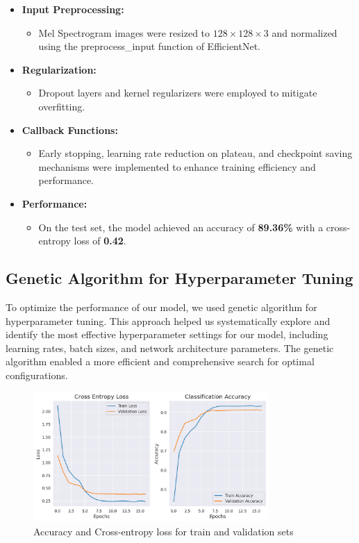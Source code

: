 \begin{itemize}
    \item \textbf{Input Preprocessing:}  
    \begin{itemize}
        \item Mel Spectrogram images were resized to \(128 \times 128 \times 3\) and normalized using the preprocess\_input function of EfficientNet.  
    \end{itemize}

    \item \textbf{Regularization:}  
    \begin{itemize}
        \item Dropout layers and kernel regularizers were employed to mitigate overfitting.  
    \end{itemize}

    \item \textbf{Callback Functions:}  
    \begin{itemize}
        \item Early stopping, learning rate reduction on plateau, and checkpoint saving mechanisms were implemented to enhance training efficiency and performance.  
    \end{itemize}

    \item \textbf{Performance:}  
    \begin{itemize}
        \item On the test set, the model achieved an accuracy of \textbf{89.36\%} with a cross-entropy loss of \textbf{0.42}.  
    \end{itemize}
\end{itemize}

\subsection{Genetic Algorithm for Hyperparameter Tuning}
To optimize the performance of our model, we used genetic algorithm for hyperparameter tuning. 
This approach helped us systematically explore and identify the most effective hyperparameter settings for our model, 
including learning rates, batch sizes, and network architecture parameters. 
The genetic algorithm enabled a more efficient and comprehensive search for optimal configurations.


\begin{figure}[h!]
    \centering
    \includegraphics[width=0.8\textwidth]{images/accuracy_and_loss.png}
    \caption{Accuracy and Cross-entropy loss for train and validation sets}
    \label{fig:visualization}
\end{figure}


